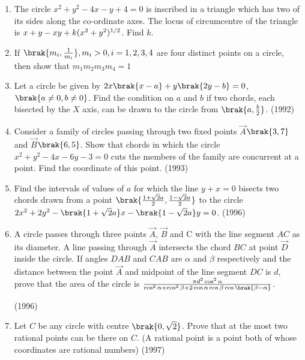 \begin{enumerate}[label=\thesubsection.\arabic*.,ref=\thesubsection.\theenumi]
%
\hfill {}
\item The circle $x^2+y^2-4x-y+4=0$ is inscribed in a triangle which has two of its sides along the co-ordinate axes. The locus of circumcentre of the triangle is $x+y-xy+k(x^2+y^2)\textsuperscript{1/2}$. Find $k$.
%
\hfill {}
\item If $\brak{ m_i,  \frac{1}{m_i}},  m_i > 0,  i = 1,  2,  3,  4$ are four distinct points on a circle,  then show that $m_1m_2m_3m_4=1$
%
\hfill {}
	\item Let a circle be given by $2x\brak{x-a}+y\brak{2y-b}=0$, $\brak{a\neq0, b\neq0}$. Find the condition on $a$ and $b$ if two chords,  each bisected by the $X$ axis, can be drawn to the circle from $\brak{a, \frac{b}{2}}$.                         
%
\hfill(1992)
%
%
%
%
\item Consider a family of circles passing through two fixed points $\vec{A}$$\brak{3, 7}$ and $\vec{B}$$\brak{6, 5}$. Show that chords in which the circle $x^2+y^2-4x-6y-3=0$ cuts the members of the family are concurrent at a point. Find the coordinate of this point.
%
\hfill(1993)
%
%
%
%
%
%
\item Find the intervals of values of $a$ for which the line $y+x=0$ bisects two chords drawn from a point $\brak {\frac{1+\sqrt{2}a}{2}, \frac{1-\sqrt{2}a}{2}}$ to the circle $2x^2+2y^2-\brak{1+\sqrt{2}a}x-\brak{1-\sqrt{2}a}y=0$.  
%
\hfill(1996)
%
\item A circle passes through three points $\vec{A}$, $\vec{B}$ and C with the line segment $AC$ as its diameter. A line passing through $\vec{A}$ intersects the chord $BC$ at point $\vec{D}$ inside the circle. If angles $DAB$ and $CAB$ are $\alpha$ and $\beta$ respectively and the distance between the point $\vec{A}$ and midpoint of the line segment $DC$ is $d$,  prove that the area of the circle is $\frac{\pi d^2 \cos^2{\alpha} }{\cos^2{\alpha}+\cos^2{\beta}+ 2\cos{\alpha} \cos{\beta} \cos{\brak{\beta-\alpha}}}$.        
%

\hfill(1996)
%
%
%
%
%
\item Let $C$ be any circle with centre $\brak{0, \sqrt{2}}$. Prove that at the most two rational points can be there on $C$. (A rational point is a point both of whose coordinates are rational numbers)
%
\hfill(1997)
%
%
%
%
%
%
%
%
%
%
%
\end{enumerate}
